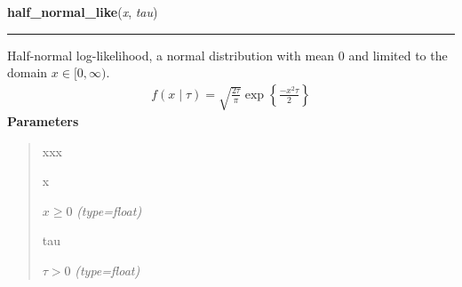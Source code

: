 \hspace{.8\funcindent}\begin{boxedminipage}{\funcwidth}

    \raggedright \textbf{half\_normal\_like}(\textit{x}, \textit{tau})

    \vspace{-1.5ex}

    \rule{\textwidth}{0.5\fboxrule}
\setlength{\parskip}{2ex}

Half-normal log-likelihood, a normal distribution with mean 0 and limited
to the domain $x \in [0, \infty)$.
\begin{equation*}\begin{split}f(x \mid \tau) = \sqrt{\frac{2\tau}{\pi}}\exp\left\{ {\frac{-x^2 \tau}{2}}\right\}\end{split}\end{equation*}\setlength{\parskip}{1ex}
      \textbf{Parameters}
      \vspace{-1ex}

      \begin{quote}
        \begin{Ventry}{xxx}

          \item[x]


$x \ge 0$
            {\it (type=float)}

          \item[tau]


$\tau > 0$
            {\it (type=float)}

        \end{Ventry}

      \end{quote}

    \end{boxedminipage}

    \label{pymc:distributions:hypergeometric_like}

    \vspace{0.5ex}

